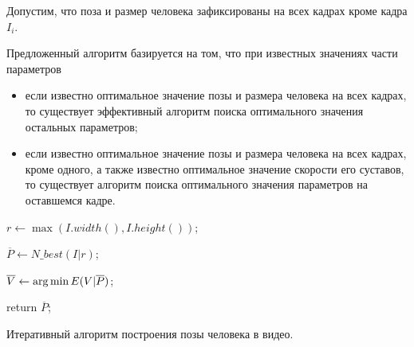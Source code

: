 Допустим, что поза и размер человека зафиксированы на всех кадрах кроме кадра $I_i$.

Предложенный алгоритм базируется на том, что при известных значениях части параметров
\begin{itemize}
	\item если известно оптимальное значение позы и размера человека на всех кадрах, то существует эффективный алгоритм поиска оптимального значения остальных параметров;
	\item если известно оптимальное значение позы и размера человека на всех кадрах, кроме одного, а также известно оптимальное значение скорости его суставов, то существует алгоритм поиска оптимального значения параметров на оставшемся кадре.
\end{itemize}

\begin{algorithm}[H]
	\SetAlgoLined %
	
	
	
	$r \leftarrow \max(I.width(), I.height())$;
	
	$\overline{P} \leftarrow N\_best(I|r)$;
	
	$\overline{V} \leftarrow \operatorname*{arg\,min}{E(V|\overline{P})}$;
	

	return $\overline{P}$;
	
	\caption{Итеративный алгоритм построения позы человека в видео.}
	\label{alg:generalInit}
\end{algorithm}

